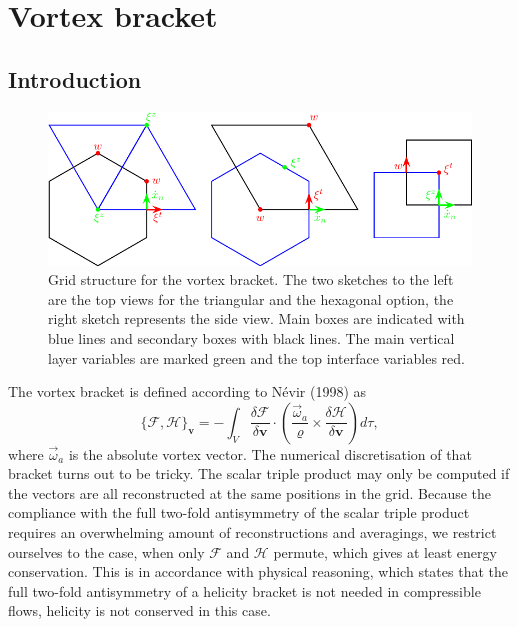 %

\chapter{Vortex bracket}
\section{Introduction}

\begin{figure}[h]
%
\begin{center}
\includegraphics{fig_vortex_boxes.pdf}
\end{center}
\caption{Grid structure for the vortex bracket. The two sketches to the left 
are the top views for the triangular and the hexagonal option, the right sketch
represents the side view. Main boxes are indicated with blue lines and secondary
boxes with black lines. The main vertical layer variables are marked green and 
the top interface variables red.}
\label{heli_grid}
\end{figure}

The vortex bracket is defined according to N\'evir (1998) as
\begin{equation}
\{\mathcal{F},\mathcal{H}\}_{\mathbf{v}}=
-\int_V\frac{\delta\mathcal{F}}{\delta\mathbf{v}}\cdot
\left(\frac{\vec{\omega}_a}{\varrho}\times
\frac{\delta\mathcal{H}}{\delta\mathbf{v}}\right)d\tau,
\label{vortex_bra}
\end{equation}
where $\vec{\omega}_a$ is the absolute vortex vector. The numerical 
discretisation of that bracket turns out to be tricky. The scalar triple 
product may only be computed if the vectors are all reconstructed at the same 
positions in the grid. Because the compliance with the full two-fold 
antisymmetry of the scalar triple product requires an overwhelming amount of 
reconstructions and averagings, we restrict ourselves to the case, when only 
$\mathcal{F}$ and $\mathcal{H}$ permute, which gives at least energy 
conservation. This is in accordance with physical reasoning, which states that 
the full two-fold antisymmetry of a helicity bracket is not needed in 
compressible flows, helicity is not conserved in this case.

